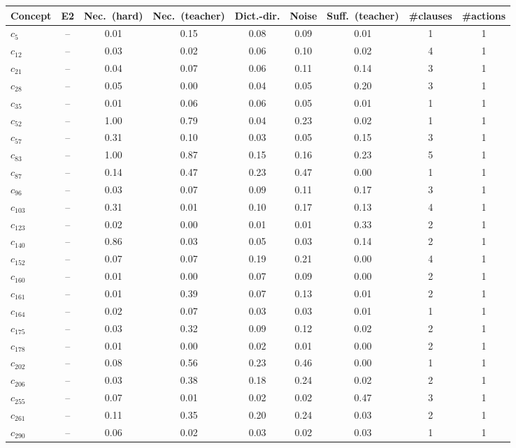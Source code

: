 \begin{tabular}{lcccccccc}
\toprule
Concept & E2 & Nec.\ (hard) & Nec.\ (teacher) & Dict.-dir. & Noise & Suff.\ (teacher) & \#clauses & \#actions \\
\midrule
$c_{5}$ & -- & 0.01 & 0.15 & 0.08 & 0.09 & 0.01 & 1 & 1 \\
$c_{12}$ & -- & 0.03 & 0.02 & 0.06 & 0.10 & 0.02 & 4 & 1 \\
$c_{21}$ & -- & 0.04 & 0.07 & 0.06 & 0.11 & 0.14 & 3 & 1 \\
$c_{28}$ & -- & 0.05 & 0.00 & 0.04 & 0.05 & 0.20 & 3 & 1 \\
$c_{35}$ & -- & 0.01 & 0.06 & 0.06 & 0.05 & 0.01 & 1 & 1 \\
$c_{52}$ & -- & 1.00 & 0.79 & 0.04 & 0.23 & 0.02 & 1 & 1 \\
$c_{57}$ & -- & 0.31 & 0.10 & 0.03 & 0.05 & 0.15 & 3 & 1 \\
$c_{83}$ & -- & 1.00 & 0.87 & 0.15 & 0.16 & 0.23 & 5 & 1 \\
$c_{87}$ & -- & 0.14 & 0.47 & 0.23 & 0.47 & 0.00 & 1 & 1 \\
$c_{96}$ & -- & 0.03 & 0.07 & 0.09 & 0.11 & 0.17 & 3 & 1 \\
$c_{103}$ & -- & 0.31 & 0.01 & 0.10 & 0.17 & 0.13 & 4 & 1 \\
$c_{123}$ & -- & 0.02 & 0.00 & 0.01 & 0.01 & 0.33 & 2 & 1 \\
$c_{140}$ & -- & 0.86 & 0.03 & 0.05 & 0.03 & 0.14 & 2 & 1 \\
$c_{152}$ & -- & 0.07 & 0.07 & 0.19 & 0.21 & 0.00 & 4 & 1 \\
$c_{160}$ & -- & 0.01 & 0.00 & 0.07 & 0.09 & 0.00 & 2 & 1 \\
$c_{161}$ & -- & 0.01 & 0.39 & 0.07 & 0.13 & 0.01 & 2 & 1 \\
$c_{164}$ & -- & 0.02 & 0.07 & 0.03 & 0.03 & 0.01 & 1 & 1 \\
$c_{175}$ & -- & 0.03 & 0.32 & 0.09 & 0.12 & 0.02 & 2 & 1 \\
$c_{178}$ & -- & 0.01 & 0.00 & 0.02 & 0.01 & 0.00 & 2 & 1 \\
$c_{202}$ & -- & 0.08 & 0.56 & 0.23 & 0.46 & 0.00 & 1 & 1 \\
$c_{206}$ & -- & 0.03 & 0.38 & 0.18 & 0.24 & 0.02 & 2 & 1 \\
$c_{255}$ & -- & 0.07 & 0.01 & 0.02 & 0.02 & 0.47 & 3 & 1 \\
$c_{261}$ & -- & 0.11 & 0.35 & 0.20 & 0.24 & 0.03 & 2 & 1 \\
$c_{290}$ & -- & 0.06 & 0.02 & 0.03 & 0.02 & 0.03 & 1 & 1 \\

\end{tabular}
